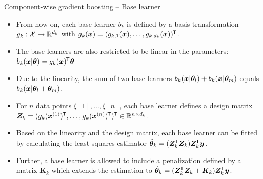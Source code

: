 \documentclass[t,10pt]{beamer}
\begin{document}
\begin{frame}{Component-wise gradient boosting -- Base learner}
  \begin{itemize}
    \item
      From now on, each base learner $b_k$ is defined by a basis transformation $g_k : \Xspace \to \R^{d_k}$ with $g_k(\xv) = (g_{k,1}(\xv), \dots, g_{k,d_k}(\xv))^\tran$.

    \item
      The base learners are also restricted to be linear in the parameters: $b_k(\xv | \tb) = g_k(\xv)^\tran \tb$

    \item
      Due to the linearity, the sum of two base learners $b_k(\xv | \tb_l) + b_k(\xv | \tb_m)$ equals $b_k(\xv | \tb_l + \tb_m)$.

    \item
      For $n$ data points $\xi[1], \dots, \xi[n]$, each base learner defines a design matrix $\design_k = (g_k(\xi[1])^\tran, \dots, g_k(\xi[n])^\tran)^\tran\in\R^{n\times d_k}$.

    \item
      Based on the linearity and the design matrix, each base learner can be fitted by calculating the least squares estimator $\tbh_k = (\design_\blk^\tran \design_\blk) \design_k^\tran \yv$.

    \item
      Further, a base learner is allowed to include a penalization defined by a matrix $\bm{K}_k$ which extends the estimation to $\tbh_k = (\design_\blk^\tran \design_\blk + \bm{K}_k) \design_k^\tran \yv$.

  \end{itemize}
\end{frame}
\end{document}
